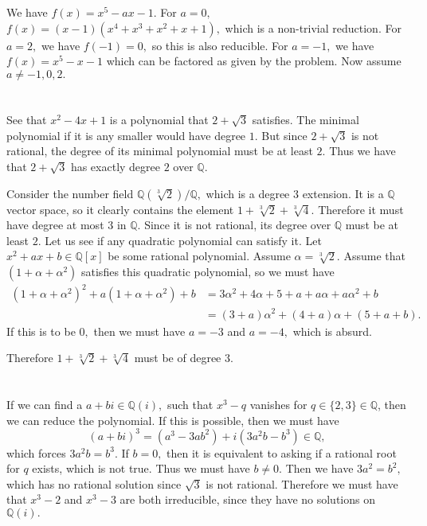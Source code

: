 \documentclass{article}
\begin{document}
\section{} %
We have $f(x)=x^5 -ax -1.$ For $a=0,$ $f(x)=(x-1)(x^4+x^3+x^2+x+1),$ which is a non-trivial reduction. For $a=2,$ we have $f(-1)=0,$ so this is also 
reducible. For $a=-1,$ we have $f(x)=x^5-x-1$ which can be factored as given by the problem. Now assume $a \neq -1,0,2.$  
\section{} %
See that $x^2-4x+1$ is a polynomial that $2 + \sqrt{3}$ satisfies. The minimal polynomial if it is any smaller would have degree $1.$ But since $2 + 
\sqrt{3}$ is not rational, the degree of its minimal polynomial must be at least $2.$ Thus we have that $2+\sqrt{3}$ has exactly degree $2$ over 
$\mathbb{Q}.$ 

Consider the number field $\mathbb{Q}(\sqrt[3]{2})/\mathbb{Q},$ which is a degree $3$ extension. It is a $\mathbb{Q}$ vector space, so it clearly contains 
the element $1 + \sqrt[3]{2} + \sqrt[3]{4}.$ Therefore it must have degree at most $3$ in $\mathbb{Q}.$ Since it is not rational, its degree over 
$\mathbb{Q}$ must be at least $2.$ Let us see if any quadratic polynomial can satisfy it. Let $x^2+ax+b \in \mathbb{Q}[x]$ be some rational polynomial. 
Assume $\alpha = \sqrt[3]{2}.$ Assume that $(1+ \alpha + \alpha^2)$ satisfies this quadratic polynomial, so we must have 
\begin{align*}
	(1+\alpha+\alpha^2)^2 + a (1+\alpha+\alpha^2) + b &= 3\alpha^2 + 4 \alpha + 5 + a + a\alpha + a\alpha^2 + b\\
	&= (3+a)\alpha^2 + (4+a)\alpha + (5+a+b). 
\end{align*}
If this is to be $0,$ then we must have $a=-3$ and $a=-4,$ which is absurd. 

Therefore $1 + \sqrt[3]{2} + \sqrt[3]{4}$ must be of degree $3.$
\section{} %
If we can find a $a+bi \in \mathbb{Q}(i),$ such that $x^3-q$ vanishes for $q \in \{2,3\} \in \mathbb{Q}$, then we can reduce the polynomial. If this is 
possible, then we must have $$ (a+bi)^3= (a^3-3ab^2) + i(3a^2b-b^3) \in \mathbb{Q},$$ which forces $3a^2b=b^3.$ If $b=0,$ then it is equivalent to asking if 
a rational root for  $q$ exists, which is not true. Thus we must have $b \neq 0.$ Then we have $3a^2=b^2,$ which has no rational solution since $\sqrt{3}$ 
is not rational. Therefore we must have that $x^3-2$ and $x^3-3$ are both irreducible, since they have no solutions on $\mathbb{Q}(i).$
\section{} %
\end{document}

